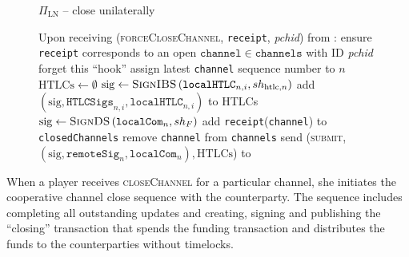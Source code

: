   \begin{figure}[H]
    \begin{protocolbox}{$\Pi_{\mathrm{LN}}$ -- close unilaterally}
      \begin{algorithmic}[1]
        \State Upon receiving (\textsc{forceCloseChannel}, \texttt{receipt},
        \textit{pchid}) from \environment:
        \Indent
          \State ensure \texttt{receipt} corresponds to an open
          $\mathtt{channel} \in \mathtt{channels}$ with ID \textit{pchid}
          \label{alg:protocol:close:unilateral:ensure}
            \State forget this ``hook''
          \EndIf
          \State assign latest \texttt{channel} sequence number to $n$
          \State $\mathrm{HTLCs} \gets \emptyset$
            \State $\mathrm{sig} \gets
            \textsc{SignIBS}\left(\mathtt{localHTLC}_{n, i}, sh_{\mathrm{htlc},
            n}\right)$
            \State add $\left(\mathrm{sig}, \mathtt{HTLCSigs}_{n, i},
            \mathtt{localHTLC}_{n, i}\right)$ to HTLCs
          \EndFor
          \State $\mathrm{sig} \gets \textsc{SignDS}\left(\mathtt{localCom}_n,
          sh_F\right)$
          \State add \texttt{receipt}(\texttt{channel}) to
          \texttt{closedChannels}
          \label{alg:protocol:close:unilateral:report}
          \State remove \texttt{channel} from \texttt{channels}
          \label{alg:protocol:close:unilateral:remove}
          \State send (\textsc{submit}, $\left(\mathrm{sig},
          \mathtt{remoteSig}_n, \mathtt{localCom}_n\right), \mathrm{HTLCs}$) to
          \ledger
          \label{alg:protocol:close:unilateral:submit}
        \EndIndent
      \end{algorithmic}
    \end{protocolbox}
    \caption{}
    \label{alg:protocol:close:unilateral}
  \end{figure}

  When a player receives \textsc{closeChannel} for a particular channel, she
  initiates the cooperative channel close sequence with the counterparty. The
  sequence includes completing all outstanding updates and creating, signing and
  publishing the ``closing'' transaction that spends the funding transaction and
  distributes the funds to the counterparties without timelocks.

